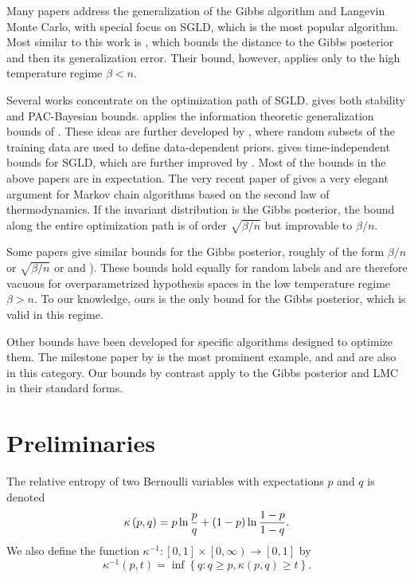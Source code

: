 \documentclass{article} %
\begin{document}
Many papers address the generalization of the Gibbs algorithm and Langevin Monte Carlo, with special focus on SGLD, which is the most popular
algorithm. Most similar to this work is \cite{raginsky2017non}, which bounds
the distance to the Gibbs posterior and then its generalization
error. Their bound, however, applies only to the high temperature regime $%
\beta <n$.

Several works concentrate on the optimization path of SGLD. \cite%
{mou2018generalization} gives both stability and PAC-Bayesian bounds. \cite%
{pensia2018generalization} applies the information theoretic generalization
bounds of \cite{xu2017information}. These ideas are further developed by 
\cite{negrea2019information}, where random subsets of the training data
are used to define data-dependent priors. \cite{farghly2021time} gives time-independent bounds for SGLD, which are further improved by \cite%
{futami2024time}. Most of the bounds in the above papers are in expectation.
The very recent paper of \cite{harel2025temperature} gives a very elegant
argument for Markov chain algorithms based on the second law of
thermodynamics. If the invariant distribution is the Gibbs posterior, the
bound along the entire optimization path is of order $\sqrt{\beta /n}$ but
improvable to $\beta /n$.

Some papers give similar bounds for the Gibbs posterior, roughly of the form $\beta /n$ or $\sqrt{\beta /n}$ \citep{raginsky2017non,dziugaite2018data,kuzborskij2019distribution,rivasplata2020pac} or \cite{maurer2024generalization} and \cite%
{harel2025temperature}). These bounds hold equally for random labels and are therefore vacuous for overparametrized hypothesis spaces in the low
temperature regime $\beta >n$. To our knowledge, ours is the only bound for the Gibbs posterior, which is valid
in this regime.

Other bounds have been developed for specific algorithms  designed to optimize them. The milestone paper by \cite{dziugaite2017computing} is the most prominent example, and  \citep{dziugaite2018data}
and \citep{perez2021tighter} are also in this category. Our bounds by contrast apply to the Gibbs posterior and LMC in
their standard forms.

\section{Preliminaries}\label{Section preliminaries}

The relative entropy of two Bernoulli variables with expectations $p$ and $q$
is denoted 
\begin{equation}
\kappa \left( p,q\right) =p\ln \frac{p}{q}+\left( 1-p\right) \ln \frac{1-p}{%
1-q}.  \label{define little kl}
\end{equation}%
 We also define the function $%
\kappa ^{-1}:\left[ 0,1\right] \times \left[ 0,\infty \right) \rightarrow %
\left[ 0,1\right] $ by%
\begin{equation*}
\kappa ^{-1}\left( p,t\right) =\inf \left\{ q:q\geq p,\kappa \left(
p,q\right) \geq t\right\} .
\end{equation*}
\end{document}
